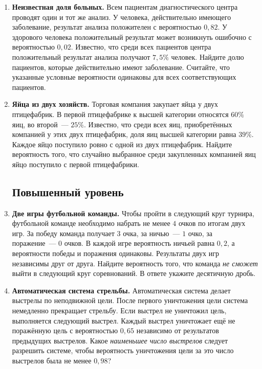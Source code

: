 \documentclass[a4paper,12pt]{article}
\begin{document}
\begin{enumerate}[label=\textbf{\arabic*.},wide=0pt]
\item \textbf{Неизвестная доля больных.} Всем пациентам диагностического центра проводят один и тот же анализ. У человека, действительно имеющего заболевание, результат анализа положителен с вероятностью $0{,}82$. У здорового человека положительный результат может возникнуть ошибочно с вероятностью $0{,}02$. Известно, что среди всех пациентов центра положительный результат анализа получают $7{,}5\%$ человек. Найдите долю пациентов, которые действительно имеют заболевание. Считайте, что указанные условные вероятности одинаковы для всех соответствующих пациентов.

\item \textbf{Яйца из двух хозяйств.} Торговая компания закупает яйца у двух птицефабрик. В первой птицефабрике к высшей категории относятся $60\%$ яиц, во второй~--- $25\%$. Известно, что среди всех яиц, приобретённых компанией у этих двух птицефабрик, доля яиц высшей категории равна $39\%$. Каждое яйцо поступило ровно с одной из двух птицефабрик. Найдите вероятность того, что случайно выбранное среди закупленных компанией яиц яйцо поступило с первой птицефабрики.

\subsection*{Повышенный уровень}
\item \textbf{Две игры футбольной команды.} Чтобы пройти в следующий круг турнира, футбольной команде необходимо набрать не менее $4$ очков по итогам двух игр. За победу команда получает $3$ очка, за ничью~--- $1$ очко, за поражение~--- $0$ очков. В каждой игре вероятность ничьей равна $0{,}2$, а вероятности победы и поражения одинаковы. Результаты двух игр независимы друг от друга. Найдите вероятность того, что команда \emph{не сможет} выйти в следующий круг соревнований. В ответе укажите десятичную дробь.

\item \textbf{Автоматическая система стрельбы.} Автоматическая система делает выстрелы по неподвижной цели. После первого уничтожения цели система немедленно прекращает стрельбу. Если выстрел не уничтожил цель, выполняется следующий выстрел. Каждый выстрел уничтожает ещё не поражённую цель с вероятностью $0{,}65$ независимо от результатов предыдущих выстрелов. Какое \emph{наименьшее число выстрелов} следует разрешить системе, чтобы вероятность уничтожения цели за это число выстрелов была не менее $0{,}98$?


\end{enumerate}
\end{document}

